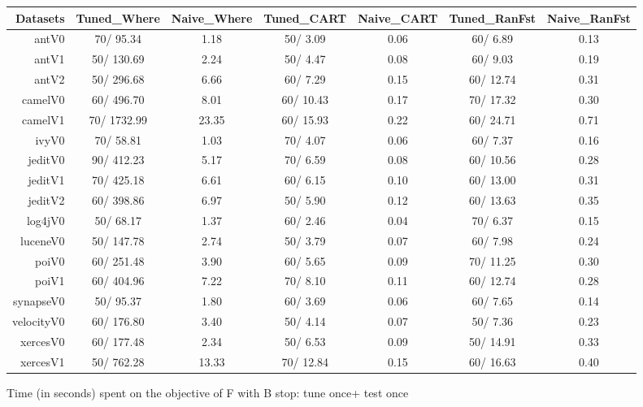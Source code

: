 \documentclass{acm_proc_article-sp}
\begin{document}
\begin{figure*}[!ht]
\scriptsize
\centering
  \begin{tabular}{r|c |c |c |c |c |c }
    \hline\hline
    Datasets & Tuned\_Where & Naive\_Where & Tuned\_CART & Naive\_CART & Tuned\_RanFst & Naive\_RanFst\\
    \hline
    antV0 & 70/ 95.34 & 1.18 & 50/ 3.09 & 0.06 & 60/ 6.89 & 0.13\\
    antV1 & 50/ 130.69 & 2.24 & 50/ 4.47 & 0.08 & 60/ 9.03 & 0.19\\
    antV2 & 50/ 296.68 & 6.66 & 60/ 7.29 & 0.15 & 60/ 12.74 & 0.31\\
    camelV0 & 60/ 496.70 & 8.01 & 60/ 10.43 & 0.17 & 70/ 17.32 & 0.30\\
    camelV1 & 70/ 1732.99 & 23.35 & 60/ 15.93 & 0.22 & 60/ 24.71 & 0.71\\
    ivyV0 & 70/ 58.81 & 1.03 & 70/ 4.07 & 0.06 & 60/ 7.37 & 0.16\\
    jeditV0 & 90/ 412.23 & 5.17 & 70/ 6.59 & 0.08 & 60/ 10.56 & 0.28\\
    jeditV1 & 70/ 425.18 & 6.61 & 60/ 6.15 & 0.10 & 60/ 13.00 & 0.31\\
    jeditV2 & 60/ 398.86 & 6.97 & 50/ 5.90 & 0.12 & 60/ 13.63 & 0.35\\
    log4jV0 & 50/ 68.17 & 1.37 & 60/ 2.46 & 0.04 & 70/ 6.37 & 0.15\\
    luceneV0 & 50/ 147.78 & 2.74 & 50/ 3.79 & 0.07 & 60/ 7.98 & 0.24\\
    poiV0 & 60/ 251.48 & 3.90 & 60/ 5.65 & 0.09 & 70/ 11.25 & 0.30\\
    poiV1 & 60/ 404.96 & 7.22 & 70/ 8.10 & 0.11 & 60/ 12.74 & 0.28\\
    synapseV0 & 50/ 95.37 & 1.80 & 60/ 3.69 & 0.06 & 60/ 7.65 & 0.14\\
    velocityV0 & 60/ 176.80 & 3.40 & 50/ 4.14 & 0.07 & 50/ 7.36 & 0.23\\
    xercesV0 & 60/ 177.48 & 2.34 & 50/ 6.53 & 0.09 & 50/ 14.91 & 0.33\\
    xercesV1 & 50/ 762.28 & 13.33 & 70/ 12.84 & 0.15 & 60/ 16.63 & 0.40\\
  \end{tabular}
  \caption{Time (in seconds) spent on the objective of F with B stop: tune once+ test once}
\end{figure*}
\end{document}
